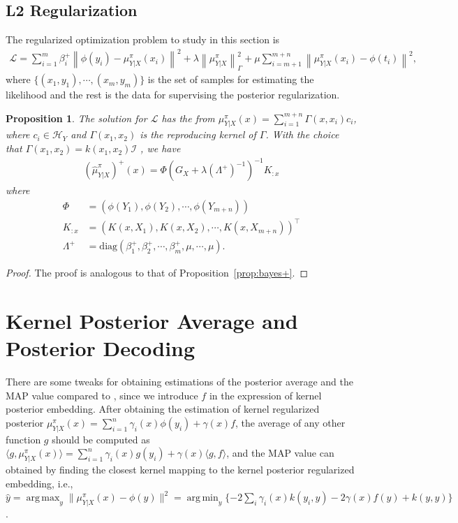 \documentclass[a4paper]{article}
\newcommand{\up}{\mathrm}
\renewcommand{\cal}{\mathcal}
\newcommand{\norm}[1]{\left\lVert#1\right\rVert}
\newcommand{\T}{\intercal}
\DeclareMathOperator*{\argmin}{arg\,min}
\DeclareMathOperator*{\argmax}{arg\,max}
\newtheorem{proposition}{Proposition}
\newcommand{\propref}[1]{Proposition~\ref{#1}}
\def\muyxplus{(\widehat{\mu}_{Y|X}^\pi)^+}
\begin{document}
\subsection{L2 Regularization}
The regularized optimization problem to study in this section is
\begin{align}
\cal{L} = \sum_{i=1}^{m} \beta_i^+ \norm{\phi(y_i) - \mu_{Y|X}^\pi(x_i)}^2 + \lambda\norm{\mu_{Y|X}^\pi}_\Gamma^2 + \mu \sum_{i=m+1}^{m+n} \norm{\mu_{Y|X}^\pi(x_i) - \phi(t_i)}^2,
\end{align}
where $\{(x_1,y_1),\cdots,(x_m,y_m)\}$ is the set of samples for estimating the likelihood and the rest is the data for supervising the posterior regularization.
\begin{proposition}
The solution for $\cal{L}$ has the from $\mu_{Y|X}^\pi(x) = \sum_{i=1}^{m+n} \Gamma(x,x_i)c_i$, where $c_i \in \cal{H}_Y$ and $\Gamma(x_1,x_2)$ is the reproducing kernel of $\Gamma$. With the choice that $\Gamma(x_1,x_2) = k(x_1,x_2)\cal{I}$ , we have
\begin{align}
\muyxplus(x) = \Phi(G_X + \lambda(\Lambda^+)^{-1})^{-1}K_{:x}\label{eqn:l2reg}
\end{align}
where
\begin{align*}
\Phi &= (\phi(Y_1),\phi(Y_2),\cdots,\phi(Y_{m+n}))\\
K_{:x} &= (K(x,X_1),K(x,X_2),\cdots,K(x,X_{m+n}))^\T\\
\Lambda^+ &= \up{diag}(\beta_1^+,\beta_2^+,\cdots,\beta_m^+,\mu,\cdots,\mu).
\end{align*}
\end{proposition}
\begin{proof}
The proof is analogous to that of \propref{prop:bayes+}.
\end{proof}
\section{Kernel Posterior Average and Posterior Decoding}
There are some tweaks for obtaining estimations of the posterior average and the MAP value compared to \cite{song2013kernel}, since we introduce $f$ in the expression of kernel posterior embedding. After obtaining the estimation of kernel regularized posterior $\mu_{Y|X}^\pi(x) = \sum_{i=1}^n \gamma_i(x) \phi(y_i) + \gamma(x) f$, the average of any other function $g$ should be computed as $\langle g, \mu_{Y|X}^\pi(x)\rangle = \sum_{i=1}^{n} \gamma_i(x)g(y_i) + \gamma(x) \langle g,f\rangle$, and the MAP value can obtained by finding the closest kernel mapping to the kernel posterior regularized embedding, i.e., $\hat{y} = \argmax_{y} \|\mu_{Y|X}^\pi(x) - \phi(y)\|^2 = \argmin_{y} \{ %
- 2\sum_i\gamma_i(x)k(y_i,y) - 2\gamma(x)f(y) + k(y,y)\}$. 
\end{document}
